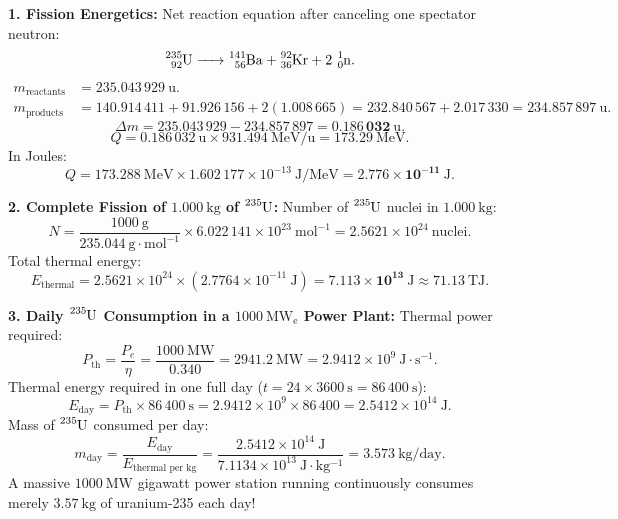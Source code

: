 \begin{solution}
\textbf{1. Fission Energetics:}
Net reaction equation after canceling one spectator neutron:
\[
\ce{^{235}_{92}U -> ^{141}_{56}Ba + ^{92}_{36}Kr + 2\,^{1}_{0}n}.
\]
\begin{align*}
m_{\text{reactants}} &= 235.043\,929\ \mathrm{u}. \\
m_{\text{products}} &= 140.914\,411 + 91.926\,156 + 2(1.008\,665) = 232.840\,567 + 2.017\,330 = 234.857\,897\ \mathrm{u}.
\end{align*}
\[
\Delta m = 235.043\,929 - 234.857\,897 = \mathbf{0.186\,032\ \mathrm{u}}.
\]
\[
Q = 0.186\,032\ \mathrm{u} \times 931.494\ \mathrm{MeV/u} = \mathbf{173.29\ \mathrm{MeV}}.
\]
In Joules:
\[
Q = 173.288\ \mathrm{MeV} \times 1.602\,177 \times 10^{-13}\ \mathrm{J/MeV} = \mathbf{2.776 \times 10^{-11}\ \mathrm{J}}.
\]

\textbf{2. Complete Fission of $1.000\ \mathrm{kg}$ of $\ce{^{235}U}$:}
Number of $\ce{^{235}U}$ nuclei in $1.000\ \mathrm{kg}$:
\[
N = \frac{1000\ \mathrm{g}}{235.044\ \mathrm{g\cdot mol^{-1}}} \times 6.022\,141 \times 10^{23}\ \mathrm{mol^{-1}} = 2.5621 \times 10^{24}\ \text{nuclei}.
\]
Total thermal energy:
\[
E_{\text{thermal}} = 2.5621 \times 10^{24} \times (2.7764 \times 10^{-11}\ \mathrm{J}) = \mathbf{7.113 \times 10^{13}\ \mathrm{J}} \approx \mathbf{71.13\ \mathrm{TJ}}.
\]

\textbf{3. Daily $\ce{^{235}U}$ Consumption in a $1000\ \mathrm{MW_e}$ Power Plant:}
Thermal power required:
\[
P_{\text{th}} = \frac{P_e}{\eta} = \frac{1000\ \mathrm{MW}}{0.340} = 2941.2\ \mathrm{MW} = 2.9412 \times 10^9\ \mathrm{J\cdot s^{-1}}.
\]
Thermal energy required in one full day ($t = 24 \times 3600\ \mathrm{s} = 86\,400\ \mathrm{s}$):
\[
E_{\text{day}} = P_{\text{th}} \times 86\,400\ \mathrm{s} = 2.9412 \times 10^9 \times 86\,400 = 2.5412 \times 10^{14}\ \mathrm{J}.
\]
Mass of $\ce{^{235}U}$ consumed per day:
\[
m_{\text{day}} = \frac{E_{\text{day}}}{E_{\text{thermal per kg}}} = \frac{2.5412 \times 10^{14}\ \mathrm{J}}{7.1134 \times 10^{13}\ \mathrm{J\cdot kg^{-1}}} = \mathbf{3.573\ \mathrm{kg/day}}.
\]
A massive $1000\ \mathrm{MW}$ gigawatt power station running continuously consumes merely $\mathbf{3.57\ \mathrm{kg}}$ of uranium-235 each day!
\end{solution}

